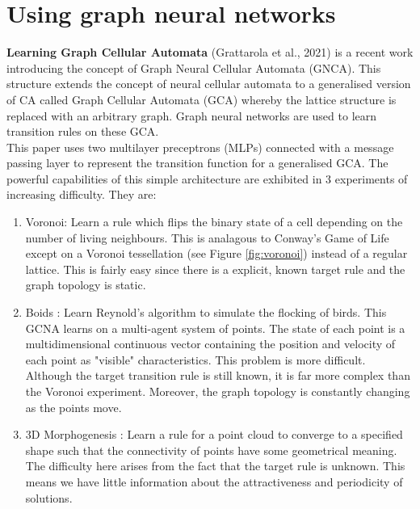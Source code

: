 \section{Using graph neural networks}
\label{sec: using-gnn}

\noindent
\textbf{Learning Graph Cellular Automata} (Grattarola et al., 2021) \cite{grattarola2021learning} is a recent work introducing the concept of Graph Neural Cellular Automata (GNCA).
This structure extends the concept of neural cellular automata to a generalised version of CA called Graph Cellular Automata (GCA) whereby the lattice structure is replaced with an arbitrary graph.
Graph neural networks are used to learn transition rules on these GCA.\\

This paper uses two multilayer preceptrons (MLPs) connected with a message passing layer to represent the transition function for a generalised GCA.
The powerful capabilities of this simple architecture are exhibited in 3 experiments of increasing difficulty. They are:

\begin{enumerate}
  \item Voronoi: Learn a rule which flips the binary state of a cell depending on the number of living neighbours. This is analagous to Conway's Game of Life except on a Voronoi tessellation (see Figure \ref{fig:voronoi}) instead of a regular lattice. This is fairly easy since there is a explicit, known target rule and the graph topology is static. 
  \item Boids : Learn Reynold's algorithm \cite{reynolds1987flocks} to simulate the flocking of birds. This GCNA learns on a multi-agent system of points. The state of each point is a multidimensional continuous vector containing the position and velocity of each point as "visible" characteristics. This problem is more difficult. Although the target transition rule is still known, it is far more complex than the Voronoi experiment. Moreover, the graph topology is constantly changing as the points move.
  \item 3D Morphogenesis : Learn a rule for a point cloud to converge to a specified shape such that the connectivity of points have some geometrical meaning. The difficulty here arises from the fact that the target rule is unknown. This means we have little information about the attractiveness and periodicity of solutions.
\end{enumerate}

